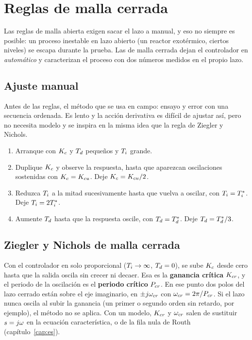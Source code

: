 \section{Reglas de malla cerrada}
\label{sec:ps-malla-cerrada}

Las reglas de malla abierta exigen sacar el lazo a manual, y eso no siempre es posible: un proceso inestable en lazo abierto (un reactor exotérmico, ciertos niveles) se escapa durante la prueba. Las de malla cerrada dejan el controlador en \emph{automático} y caracterizan el proceso con dos números medidos en el propio lazo.

\subsection{Ajuste manual}

Antes de las reglas, el método que se usa en campo: ensayo y error con una secuencia ordenada. Es lento y la acción derivativa es difícil de ajustar así, pero no necesita modelo y se inspira en la misma idea que la regla de Ziegler y Nichols.
\begin{receta}
\begin{enumerate}
  \item Arranque con $K_c$ y $T_d$ pequeños y $T_i$ grande.
  \item Duplique $K_c$ y observe la respuesta, hasta que aparezcan oscilaciones sostenidas con $K_c=K_{cu}$. Deje $K_c=K_{cu}/2$.
  \item Reduzca $T_i$ a la mitad sucesivamente hasta que vuelva a oscilar, con $T_i=T_i^*$. Deje $T_i=2T_i^*$.
  \item Aumente $T_d$ hasta que la respuesta oscile, con $T_d=T_d^*$. Deje $T_d=T_d^*/3$.
\end{enumerate}
\end{receta}

\subsection{Ziegler y Nichols de malla cerrada}

Con el controlador en solo proporcional ($T_i\to\infty$, $T_d=0$), se sube $K_c$ desde cero hasta que la salida oscila sin crecer ni decaer. Esa es la \textbf{ganancia crítica} $K_{cr}$, y el periodo de la oscilación es el \textbf{periodo crítico} $P_{cr}$. En ese punto dos polos del lazo cerrado están sobre el eje imaginario, en $\pm j\omega_{cr}$ con $\omega_{cr}=2\pi/P_{cr}$. Si el lazo nunca oscila al subir la ganancia (un primer o segundo orden sin retardo, por ejemplo), el método no se aplica. Con un modelo, $K_{cr}$ y $\omega_{cr}$ salen de sustituir $s=j\omega$ en la ecuación característica, o de la fila nula de Routh (capítulo~\ref{cap:es}).

